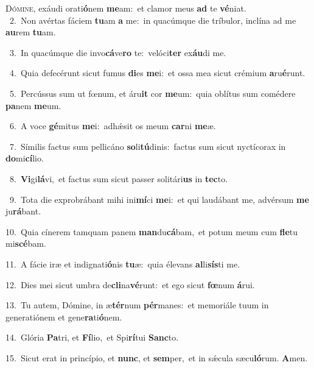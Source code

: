 \lettrine{\initial\textcolor{\initialcolor}{D}}{ómine,} exáudi orati\-\textbf{ó}\-nem \textbf{me}\-am:~\star et clamor meus \textbf{ad} te \textbf{vé}\-niat.\\
{\numbfont\textcolor{\numbcolor}{~2.}}~Non avértas fáciem \textbf{tu}\-am \textbf{a} me:~\star in quacúmque die tríbulor, inclína ad me \textbf{au}\-rem \textbf{tu}\-am.\par
{\numbfont\textcolor{\numbcolor}{~3.}}~In quacúmque die invo\-\textbf{cá}\-ve\textbf{ro} te:~\star velóci\textbf{ter} ex\-\textbf{áu}\-di me.\par
{\numbfont\textcolor{\numbcolor}{~4.}}~Quia defecérunt sicut fumus \textbf{di}\-es \textbf{me}\-i:~\star et ossa mea sicut crémium \textbf{a}\-ru\-\textbf{é}\-runt.\par
{\numbfont\textcolor{\numbcolor}{~5.}}~Percússus sum ut fœnum, et áru\textbf{it} cor \textbf{me}\-um:~\star quia oblítus sum comédere \textbf{pa}\-nem \textbf{me}\-um.\par
{\numbfont\textcolor{\numbcolor}{~6.}}~A voce \textbf{gé}\-mitus \textbf{me}\-i:~\star adhǽsit os meum \textbf{car}\-ni \textbf{me}\-æ.\par
{\numbfont\textcolor{\numbcolor}{~7.}}~Símilis factus sum pellicáno \textbf{so}\-li\-\textbf{tú}\-dinis:~\star factus sum sicut nyctícorax in \textbf{do}\-mi\-\textbf{cí}\-lio.\par
{\numbfont\textcolor{\numbcolor}{~8.}}~\-\textbf{Vi}\-gi\-\textbf{lá}\-vi,~\star et factus sum sicut passer solitári\textbf{us} in \textbf{tec}\-to.\par
{\numbfont\textcolor{\numbcolor}{~9.}}~Tota die exprobrábant mihi ini\-\textbf{mí}\-ci \textbf{me}\-i:~\star et qui laudábant me, advérsum \textbf{me} ju\-\textbf{rá}\-bant.\par
{\numbfont\textcolor{\numbcolor}{10.}}~Quia cínerem tamquam panem \textbf{man}\-du\-\textbf{cá}\-bam,~\star et potum meum cum \textbf{fle}\-tu mi\-\textbf{scé}\-bam.\par
{\numbfont\textcolor{\numbcolor}{11.}}~A fácie iræ et indignati\-\textbf{ó}\-nis \textbf{tu}\-æ:~\star quia élevans \textbf{al}\-li\-\textbf{sís}\-ti me.\par
{\numbfont\textcolor{\numbcolor}{12.}}~Dies mei sicut umbra de\-\textbf{cli}\-na\-\textbf{vé}\-runt:~\star et ego sicut \textbf{fœ}\-num \textbf{á}\-rui.\par
{\numbfont\textcolor{\numbcolor}{13.}}~Tu autem, Dómine, in æ\-\textbf{tér}\-num \textbf{pér}\-manes:~\star et memoriále tuum in generatiónem et gene\-\textbf{ra}\-ti\-\textbf{ó}\-nem.\par
{\numbfont\textcolor{\numbcolor}{14.}}~Glória \textbf{Pa}\-tri, et \textbf{Fí}\-lio,~\star et Spi\-\textbf{rí}\-tui \textbf{Sanc}\-to.\par
{\numbfont\textcolor{\numbcolor}{15.}}~Sicut erat in princípio, et \textbf{nunc}\-, et \textbf{sem}\-per,~\star et in sǽcula sæcu\-\textbf{ló}\-rum. \textbf{A}\-men.\par
